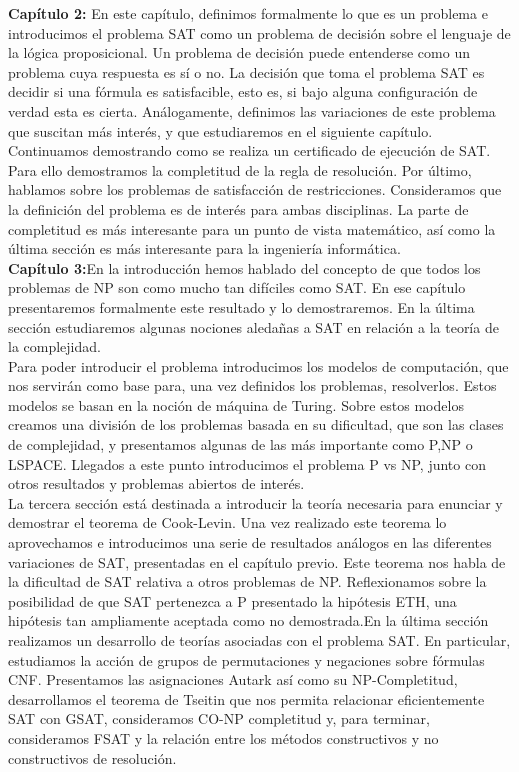 \textbf{Capítulo 2:} En este capítulo, definimos formalmente lo que es un problema e introducimos el problema SAT como un problema de decisión sobre el lenguaje de la lógica proposicional. Un  problema de decisión puede entenderse como un problema cuya respuesta es sí o no. La decisión que toma el problema SAT es decidir si una fórmula es satisfacible, esto es, si bajo alguna configuración de verdad esta es cierta. Análogamente, definimos las variaciones de este problema que suscitan más interés, y que estudiaremos en el siguiente capítulo. Continuamos demostrando como se realiza un certificado de ejecución de SAT. Para ello demostramos la completitud de la regla de resolución. Por último, hablamos sobre los problemas de satisfacción de restricciones. Consideramos que la definición del problema es de interés para ambas disciplinas. La parte de completitud es más interesante para un punto de vista matemático, así como la última sección es más interesante para la ingeniería informática.\\

\textbf{Capítulo 3:}En la introducción hemos hablado del concepto de que todos los problemas de NP son como mucho tan difíciles como SAT. En ese capítulo presentaremos formalmente este resultado y lo demostraremos. En la última sección estudiaremos algunas nociones aledañas a SAT en relación a la teoría de la complejidad.\\

Para poder introducir el problema introducimos los modelos de computación, que nos servirán como base para, una vez definidos los problemas, resolverlos. Estos modelos se basan en la noción de máquina de Turing. Sobre estos modelos creamos una división de los problemas basada en su dificultad, que son las clases de complejidad, y presentamos algunas de las más importante como P,NP o LSPACE. Llegados a este punto introducimos el problema P vs NP, junto con otros resultados y problemas abiertos de interés.\\


La tercera sección está destinada a introducir la teoría necesaria para enunciar y demostrar el teorema de Cook-Levin. Una vez realizado este teorema lo aprovechamos e  introducimos una serie de resultados análogos en las diferentes variaciones de SAT, presentadas en el capítulo previo. Este teorema nos habla de la dificultad de SAT relativa a otros problemas de NP. Reflexionamos sobre la posibilidad de que SAT pertenezca a P presentado la hipótesis ETH, una hipótesis tan ampliamente aceptada como no demostrada.En la última sección realizamos un desarrollo de teorías asociadas con el problema SAT. En particular, estudiamos la acción de grupos de permutaciones y negaciones sobre fórmulas CNF. Presentamos las asignaciones Autark así como su NP-Completitud, desarrollamos el teorema de Tseitin que nos permita relacionar eficientemente SAT con GSAT, consideramos CO-NP completitud y, para terminar, consideramos FSAT y la relación entre los métodos constructivos y no constructivos de resolución.\\

